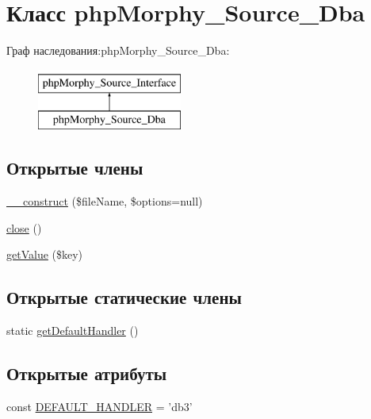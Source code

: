 \hypertarget{classphpMorphy__Source__Dba}{
\section{Класс phpMorphy\_\-Source\_\-Dba}
\label{classphpMorphy__Source__Dba}
}
Граф наследования:phpMorphy\_\-Source\_\-Dba:\begin{figure}[H]
\begin{center}
\leavevmode
\includegraphics[height=2.000000cm]{classphpMorphy__Source__Dba}
\end{center}
\end{figure}
\subsection*{Открытые члены}
\begin{DoxyCompactItemize}
\item 
\hyperlink{classphpMorphy__Source__Dba_a3025ba09765e40492eb06347518875fc}{\_\-\_\-construct} (\$fileName, \$options=null)
\item 
\hyperlink{classphpMorphy__Source__Dba_a55de2a3265f848a59185172bf49ea631}{close} ()
\item 
\hyperlink{classphpMorphy__Source__Dba_a5a2d7b05b8923d4480ecc1fa5f4b97a4}{getValue} (\$key)
\end{DoxyCompactItemize}
\subsection*{Открытые статические члены}
\begin{DoxyCompactItemize}
\item 
static \hyperlink{classphpMorphy__Source__Dba_a44146074bb98b65badcfdc13fbdd31df}{getDefaultHandler} ()
\end{DoxyCompactItemize}
\subsection*{Открытые атрибуты}
\begin{DoxyCompactItemize}
\item 
const \hyperlink{classphpMorphy__Source__Dba_a5ec31baa64aa2e03cc01d8461e16b6ac}{DEFAULT\_\-HANDLER} = 'db3'
\end{DoxyCompactItemize}
